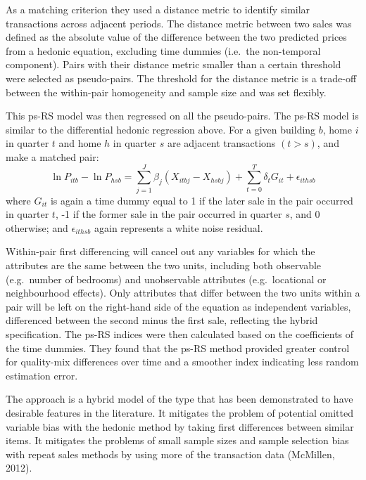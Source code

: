 \documentclass[12pt,]{article}
\begin{document}
As a matching criterion they used a distance metric to identify similar
transactions across adjacent periods. The distance metric between two
sales was defined as the absolute value of the difference between the
two predicted prices from a hedonic equation, excluding time dummies
(i.e.~the non-temporal component). Pairs with their distance metric
smaller than a certain threshold were selected as pseudo-pairs. The
threshold for the distance metric is a trade-off between the within-pair
homogeneity and sample size and was set flexibly.

This ps-RS model was then regressed on all the pseudo-pairs. The ps-RS
model is similar to the differential hedonic regression above. For a
given building \(b\), home \(i\) in quarter \(t\) and home \(h\) in
quarter \(s\) are adjacent transactions \((t>s)\), and make a matched
pair:
\[\ln P_{itb} - \ln P_{hsb} = \sum_{j=1}^J \beta_j (X_{itbj} - X_{hsbj}) + \sum_{t=0}^T \delta_t G_{it} + \epsilon_{ithsb}\]
where \(G_{it}\) is again a time dummy equal to 1 if the later sale in
the pair occurred in quarter \(t\), -1 if the former sale in the pair
occurred in quarter \(s\), and 0 otherwise; and \(\epsilon_{ithsb}\)
again represents a white noise residual.

Within-pair first differencing will cancel out any variables for which
the attributes are the same between the two units, including both
observable (e.g.~number of bedrooms) and unobservable attributes
(e.g.~locational or neighbourhood effects). Only attributes that differ
between the two units within a pair will be left on the right-hand side
of the equation as independent variables, differenced between the second
minus the first sale, reflecting the hybrid specification. The ps-RS
indices were then calculated based on the coefficients of the time
dummies. They found that the ps-RS method provided greater control for
quality-mix differences over time and a smoother index indicating less
random estimation error.

The approach is a hybrid model of the type that has been demonstrated to
have desirable features in the literature. It mitigates the problem of
potential omitted variable bias with the hedonic method by taking first
differences between similar items. It mitigates the problems of small
sample sizes and sample selection bias with repeat sales methods by
using more of the transaction data (McMillen, 2012).
\end{document}
